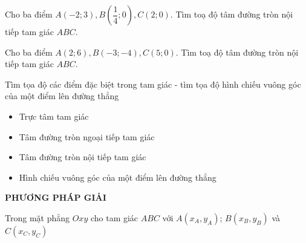 \begin{bt}%
	Cho ba điểm $A(-2;3),B(\dfrac{1}{4};0),C(2;0)$. Tìm toạ độ tâm  đường tròn nội tiếp tam giác $ABC$.
\end{bt}
\begin{bt}%
	Cho  ba điểm $A(2;6), B(-3;-4), C(5;0). $ Tìm toạ độ tâm đường tròn nội tiếp tam giác $ABC$.
\end{bt}
\begin{dang}{Tìm tọa độ các điểm đặc biệt trong tam giác - tìm tọa độ hình chiếu vuông góc của một điểm lên đường thẳng}
	\begin{itemize}
		\item Trực tâm tam giác
		\item Tâm đường tròn ngoại tiếp tam giác
		\item Tâm đường tròn nội tiếp tam giác
		\item Hình chiếu vuông góc của một điểm lên đường thẳng
	\end{itemize}
\end{dang}
\begin{center}
	\textbf{PHƯƠNG PHÁP GIẢI}
\end{center}
Trong mặt phẳng $Oxy$ cho tam giác $ABC$ với $A(x_A,y_A)$; $B(x_B,y_B)$ và $C(x_C,y_C)$
